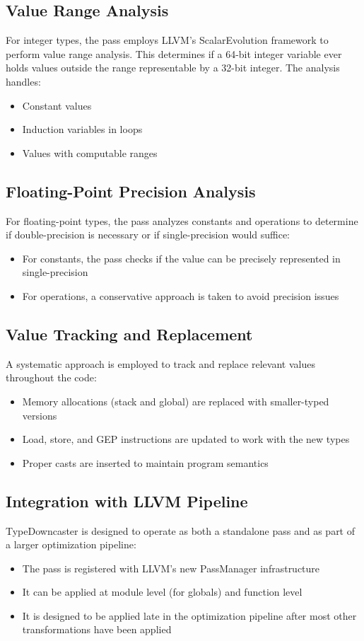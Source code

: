 \documentclass[conference]{IEEEtran}
\begin{document}
\subsection{Value Range Analysis}
For integer types, the pass employs LLVM's ScalarEvolution framework to perform value range analysis. This determines if a 64-bit integer variable ever holds values outside the range representable by a 32-bit integer. The analysis handles:
\begin{itemize}
    \item Constant values
    \item Induction variables in loops
    \item Values with computable ranges
\end{itemize}

\subsection{Floating-Point Precision Analysis}
For floating-point types, the pass analyzes constants and operations to determine if double-precision is necessary or if single-precision would suffice:
\begin{itemize}
    \item For constants, the pass checks if the value can be precisely represented in single-precision
    \item For operations, a conservative approach is taken to avoid precision issues
\end{itemize}

\subsection{Value Tracking and Replacement}
A systematic approach is employed to track and replace relevant values throughout the code:
\begin{itemize}
    \item Memory allocations (stack and global) are replaced with smaller-typed versions
    \item Load, store, and GEP instructions are updated to work with the new types
    \item Proper casts are inserted to maintain program semantics
\end{itemize}

\subsection{Integration with LLVM Pipeline}
TypeDowncaster is designed to operate as both a standalone pass and as part of a larger optimization pipeline:
\begin{itemize}
    \item The pass is registered with LLVM's new PassManager infrastructure
    \item It can be applied at module level (for globals) and function level
    \item It is designed to be applied late in the optimization pipeline after most other transformations have been applied
\end{itemize}
\end{document}
